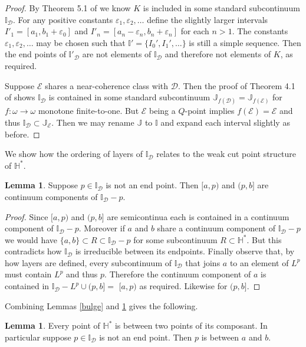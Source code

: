 \documentclass[12pt]{article}
\theoremstyle{plain}
\theoremstyle{definition}
\newtheorem{lemma}[theorem]{Lemma}
\newcommand{\E}{\ensuremath{\varepsilon}}
\newcommand{\W}{\ensuremath{\omega}}
\newcommand{\II}{\ensuremath{\mathbb I}}
\newcommand{\JJ}{\ensuremath{\mathbb J}}
\newcommand{\HH}{\ensuremath{\mathbb H}}
\newcommand{\0}{\ensuremath{\varnothing}}
\newcommand{\cD}{\ensuremath{\mathcal D}}
\newcommand{\cE}{\ensuremath{\mathcal E}}
\begin{document}
	\begin{proof}
		By Theorem 5.1 of \cite{CS1} we know $K$ is included in some standard subcontinuum $\II_\cD$. For any positive constants $\E_1, \E_2, \ldots$ define the slightly larger intervals $I'_1 = [a_1, b_1 + \E_0]$ and $I'_n = [a_n- \E_n, b_n + \E_n]$ for each $n>1$. The constants $\E_1, \E_2, \ldots$ may be chosen such that $\II' = \{I_0', I_1' , \ldots\}$ is still a simple sequence. Then the end points of $\II'_\cD$ are not elements of $\II_\cD$ and therefore not elements of $K$, as required.
		
		Suppose $\cE$ shares a near-coherence class with $\cD$. Then the proof of Theorem 4.1 of \cite{NCF2} shows $\II_\cD$ is contained in some standard subcontinuum $\JJ_{f(\cD)} = \JJ_{f(\cE)}$ for $f \colon \W \to \W$ monotone finite-to-one. But $\cE$ being a $Q$-point implies $f(\cE)=\cE$ and thus $\II_\cD \subset \JJ_\cE$. Then we may rename $\JJ$ to $\II$ and expand each interval slightly as before.
	\end{proof}
	
	We show how the ordering of layers of $\II_\cD$ relates to the weak cut point structure of $\HH^*$.
	
	
	\begin{lemma} \label{2}
		Suppose $p \in \II_\cD$ is not an end point. Then $[a,p)$ and $(p,b]$ are continuum components of $\II_\cD-p$.
	\end{lemma}
	
	
	\begin{proof} 
		Since $[a,p)$ and $(p,b]$ are semicontinua each is contained in a continuum component of $\II_\cD-p$.
		Moreover if $a$ and $b$ share a continuum component of $\II_\cD -p$ we would have $\{a,b\} \subset R \subset \II_\cD-p$ for some subcontinuum $R \subset \HH^*$. But this contradicts how $\II_\cD$ is irreducible between its endpoints. Finally observe that, by  how layers are defined, every subcontinuum of $\II_\cD$ that joins $a$ to an element of $L^p$ must contain $L^p$ and thus $p$. Therefore the continuum component of $a$ is contained in $\II_\cD - L^p \cup (p,b] = $ $[a,p)$ as required. 
		Likewise for $(p,b]$.
	\end{proof}
	
	Combining Lemmas \ref{bulge} and \ref{2} gives the following.
	
	\begin{lemma} \label{wcp}
		Every point of $\HH^*$ is between two points of its composant. In particular suppose $p \in \II_\cD$ is not an end point. Then $p$ is between $a$ and $b$. 
	\end{lemma}
	
\end{document}
